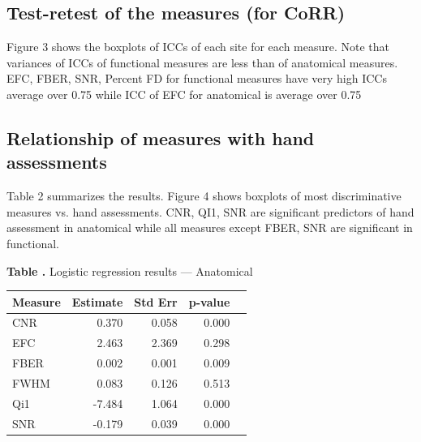 \subsection{Test-retest of the measures (for CoRR)}
Figure 3 shows the boxplots of ICCs of each site for each measure. Note that variances of ICCs of functional measures are less than of anatomical measures. EFC, FBER, SNR, Percent FD for functional measures have very high ICCs average over 0.75 while ICC of EFC for anatomical is average over 0.75

\subsection{Relationship of measures with hand assessments}
Table 2 summarizes the results. Figure 4 shows boxplots of most discriminative measures vs. hand assessments. CNR, QI1, SNR are significant predictors of hand assessment in anatomical while all measures except FBER, SNR are significant in functional.

\begin{table}
\textbf{\label{tab_log_reg_anat} Table .}{ Logistic regression results --- Anatomical }
  \begin{center}
    \begin{tabular}{ l r r r p{1.2cm} }
    \hline
    Measure  &Estimate & Std Err & p-value  \\ \hline
    CNR	&	0.370	&	0.058	&	0.000	\\
    EFC	&	2.463	&	2.369	&	0.298	\\
    FBER&	0.002	&	0.001	&	0.009	\\
    FWHM&	0.083	&	0.126	&	0.513	\\
    Qi1	&	-7.484	&	1.064	&	0.000	\\
    SNR	&	-0.179	&	0.039	&	0.000	\\
    \hline
    \end{tabular}

  \end{center}
\end{table}

